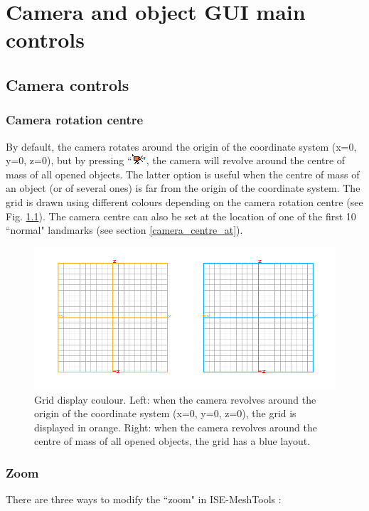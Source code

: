 \chapter{Camera and object GUI main controls}
\minitoc  

 \section{Camera controls}
\subsection{Camera rotation centre}
By default, the camera rotates around the origin of the coordinate system (x=0, y=0, z=0), but by pressing ``\includegraphics[scale=0.7]{images/pixmap/Move_cam.png}", the camera will revolve around the centre of mass of all opened objects. The latter option is useful when the centre of mass of an object (or of several ones) is far from the origin of the coordinate system. The grid is drawn using different colours depending on the camera rotation centre (see Fig. \ref{grid_colour}). The camera centre can also be set at the location of one of the first 10 ``normal" landmarks (see section \ref{camera_centre_at}).

\begin{figure}
  \centering
  \includegraphics[scale=0.4]{images/GUI/Camera_rotation_centre.png} 
	\caption{Grid display coulour. Left: when the camera revolves around the origin of the coordinate system (x=0, y=0, z=0), the grid is displayed in orange. Right: when the camera revolves around the centre of mass of all opened objects, the grid has a blue layout.}
\label{grid_colour}
 
\end{figure}

\subsection{Zoom}
There are three ways to modify the ``zoom" in ISE-MeshTools :


